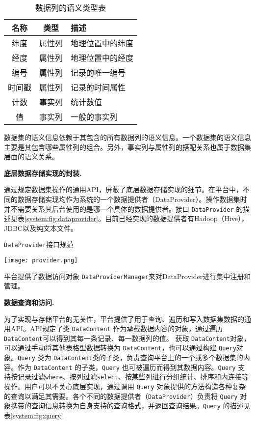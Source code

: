 \begin{table}
\centering
\caption{数据列的语义类型表}
\label{system:tab:columnTypes}
\begin{tabular}{|c|c|l|} \hline
名称 & 类型 & 描述\\ \hline
纬度 & 属性列 & 地理位置中的纬度\\ \hline
经度 & 属性列 & 地理位置中的经度\\ \hline
编号 & 属性列 & 记录的唯一编号\\ \hline
时间戳 & 属性列 & 记录的时间属性\\ \hline
计数 & 事实列 & 统计数值 \\ \hline
值 & 事实列 & 一般的事实列 \\
\hline\end{tabular}
\end{table}

数据集的语义信息依赖于其包含的所有数据列的语义信息。一个数据集的语义信息主要是其包含哪些属性列的组合。另外，事实列与属性列的搭配关系也属于数据集层面的语义关系。

\textbf{底层数据存储实现的封装.} 

通过规定数据集操作的通用API，屏蔽了底层数据存储实现的细节。在平台中，不同的数据存储实现均作为系统的一个数据提供者（DataProvider）。操作数据集时并不需要关系其后台使用的是哪一个具体的数据提供者。接口 \texttt{DataProvider} 的描述见表\ref{system:fig:dataprovider}。目前已经实现的数据提供者有Hadoop（Hive），JDBC以及纯文本文件。

\begin{table}[htbp]
  \centering 
   \caption{\texttt{DataProvider}接口规范}
    \texttt{[image: provider.png]}
  \label{system:fig:dataprovider}
\end{table}

平台提供了数据访问对象 \texttt{DataProviderManager}来对DataProvider进行集中注册和管理。

\textbf{数据查询和访问.} 

为了实现与存储平台的无关性，平台提供了用于查询、遍历和写入数据集数据的通用API。API规定了类 \texttt{DataContent} 作为承载数据内容的对象，通过遍历 \texttt{DataContent}可以得到其每一条记录、每一数据列的值。
获取 \texttt{DataContent}对象，可以通过手动将其他表格型数据转换为 \texttt{DataContent}，也可以通过构建 \texttt{Query}对象。\texttt{Query} 类为 \texttt{DataContent}类的子类，负责查询平台上的一个或多个数据集的内容。作为 \texttt{DataContent} 的子类，\texttt{Query} 也可被遍历而得到其数据内容。\texttt{Query} 支持按记录过滤\texttt{where}、按列过滤\texttt{select}、按某些列进行分组统计、排序和内连接等操作。用户可以不关心底层实现，通过调用 \texttt{Query} 对象提供的方法构造各种复杂的查询以满足其需要。各个不同的数据提供者（\texttt{DataProvider}）负责将 \texttt{Query} 对象携带的查询信息转换为自身支持的查询格式，并返回查询结果。\texttt{Query} 的描述见表\ref{system:fig:query}

